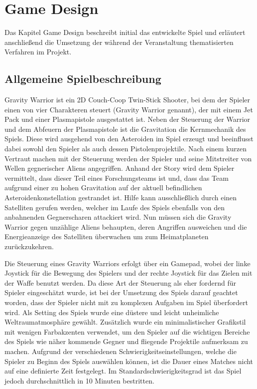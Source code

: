 \documentclass[11pt]{scrartcl}
\begin{document}
\newpage
\section{Game Design}
Das Kapitel Game Design beschreibt initial das entwickelte Spiel und erläutert anschließend die Umsetzung der während der Veranstaltung thematisierten Verfahren im Projekt.
\subsection{Allgemeine Spielbeschreibung}
Gravity Warrior ist ein 2D Couch-Coop Twin-Stick Shooter, bei dem der Spieler einen von vier Charakteren steuert (Gravity Warrior genannt), der mit einem Jet Pack und einer Plasmapistole ausgestattet ist. Neben der Steuerung der Warrior und dem Abfeuern der Plasmapistole ist die Gravitation die Kernmechanik des Spiels. Diese wird ausgehend von den Asteroiden im Spiel erzeugt und beeinflusst dabei sowohl den Spieler als auch dessen Pistolenprojektile. Nach einem kurzen Vertraut machen mit der Steuerung werden der Spieler und seine Mitstreiter von Wellen gegnerischer Aliens angegriffen. Anhand der Story wird dem Spieler vermittelt, dass dieser Teil eines Forschungsteams ist und, dass das Team aufgrund einer zu hohen Gravitation auf der aktuell befindlichen Asteroidenkonstellation gestrandet ist. Hilfe kann ausschließlich durch einen Satelliten gerufen werden, welcher im Laufe des Spiels ebenfalls von den anbahnenden Gegnerscharen attackiert wird. Nun müssen sich die Gravity Warrior gegen unzählige Aliens behaupten, deren Angriffen ausweichen und die Energieanzeige des Satelliten überwachen um zum Heimatplaneten zurückzukehren.

Die Steuerung eines Gravity Warriors erfolgt über ein Gamepad, wobei der linke Joystick für die Bewegung des Spielers und der rechte Joystick für das Zielen mit der Waffe benutzt werden. Da diese Art der Steuerung als eher fordernd für Spieler eingeschätzt wurde, ist bei der Umsetzung des Spiels darauf geachtet worden, dass der Spieler nicht mit zu komplexen Aufgaben im Spiel überfordert wird. Als Setting des Spiels wurde eine düstere und leicht unheimliche Weltraumatmosphäre gewählt. Zusätzlich wurde ein minimalistischer Grafikstil mit wenigen Farbakzenten verwendet, um den Spieler auf die wichtigen Bereiche des Spiels wie näher kommende Gegner und fliegende Projektile aufmerksam zu machen. Aufgrund der verschiedenen Schwierigkeitseinstellungen, welche die Spieler zu Beginn des Spiels auswählen können, ist die Dauer eines Matches nicht auf eine definierte Zeit festgelegt. Im Standardschwierigkeitsgrad ist das Spiel jedoch durchschnittlich in 10 Minuten bestritten.
\end{document}
